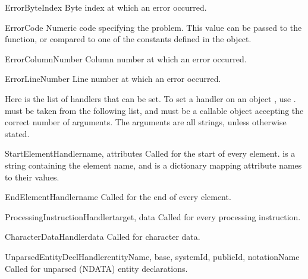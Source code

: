 \begin{memberdesc}[xmlparser]{ErrorByteIndex} 
Byte index at which an error occurred.
\end{memberdesc} 

\begin{memberdesc}[xmlparser]{ErrorCode} 
Numeric code specifying the problem.  This value can be passed to the
 function, or compared to one of the constants
defined in the  object.
\end{memberdesc}

\begin{memberdesc}[xmlparser]{ErrorColumnNumber} 
Column number at which an error occurred.
\end{memberdesc}

\begin{memberdesc}[xmlparser]{ErrorLineNumber}
Line number at which an error occurred.
\end{memberdesc}

Here is the list of handlers that can be set.  To set a handler on an
 object , use
.   must
be taken from the following list, and  must be a callable
object accepting the correct number of arguments.  The arguments are
all strings, unless otherwise stated.

\begin{methoddesc}[xmlparser]{StartElementHandler}{name, attributes}
Called for the start of every element.   is a string
containing the element name, and  is a dictionary
mapping attribute names to their values.
\end{methoddesc}

\begin{methoddesc}[xmlparser]{EndElementHandler}{name}
Called for the end of every element.
\end{methoddesc}

\begin{methoddesc}[xmlparser]{ProcessingInstructionHandler}{target, data}
Called for every processing instruction.  
\end{methoddesc}

\begin{methoddesc}[xmlparser]{CharacterDataHandler}{data}
Called for character data.  
\end{methoddesc}

\begin{methoddesc}[xmlparser]{UnparsedEntityDeclHandler}{entityName, base,
                                                         systemId, publicId,
                                                         notationName}
Called for unparsed (NDATA) entity declarations.
\end{methoddesc}

